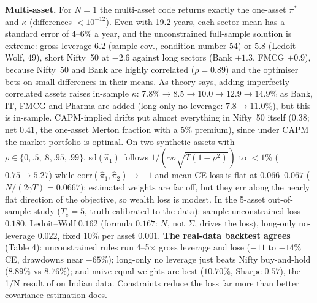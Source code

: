 \documentclass[10pt,a4paper]{article}
\begin{document}
\textbf{Multi-asset.} For $N{=}1$ the multi-asset code returns exactly the one-asset $\pi^*$ and $\kappa$ (differences $<10^{-12}$). Even with 19.2 years, each sector mean has a standard error of 4--6\% a year, and the unconstrained full-sample solution is extreme: gross leverage $6.2$ (sample cov., condition number $54$) or $5.8$ (Ledoit--Wolf, $49$), short Nifty~50 at $-2.6$ against long sectors (Bank $+1.3$, FMCG $+0.9$), because Nifty~50 and Bank are highly correlated ($\rho=0.89$) and the optimiser bets on small differences in their means. As theory says, adding imperfectly correlated assets raises in-sample $\kappa$: $7.8\%\to8.5\to10.0\to12.9\to14.9\%$ as Bank, IT, FMCG and Pharma are added (long-only no leverage: $7.8\to11.0\%$), but this is in-sample. CAPM-implied drifts put almost everything in Nifty~50 itself ($0.38$; net $0.41$, the one-asset Merton fraction with a 5\% premium), since under CAPM the market portfolio is optimal. On two synthetic assets with $\rho\in\{0,.5,.8,.95,.99\}$, $\mathrm{sd}(\hat\pi_1)$ follows $1/(\gamma\sigma\sqrt{T(1-\rho^2)})$ to $<1\%$ ($0.75\to5.27$) while $\mathrm{corr}(\hat\pi_1,\hat\pi_2)\to-1$ and mean CE loss is flat at $0.066$--$0.067$ ($N/(2\gamma T)=0.0667$): estimated weights are far off, but they err along the nearly flat direction of the objective, so wealth loss is modest. In the 5-asset out-of-sample study ($T_e=5$, truth calibrated to the data): sample unconstrained loss $0.180$, Ledoit--Wolf $0.162$ (formula $0.167$: $N$, not $\Sigma$, drives the loss), long-only no-leverage $0.022$, fixed 10\% per asset $0.001$. \textbf{The real-data backtest agrees} (Table 4): unconstrained rules run 4--5$\times$ gross leverage and lose ($-11$ to $-14\%$ CE, drawdowns near $-65\%$); long-only no leverage just beats Nifty buy-and-hold ($8.89\%$ vs $8.76\%$); and naive equal weights are best ($10.70\%$, Sharpe $0.57$), the 1/N result of \cite{dm} on Indian data. Constraints reduce the loss far more than better covariance estimation does.
\end{document}
